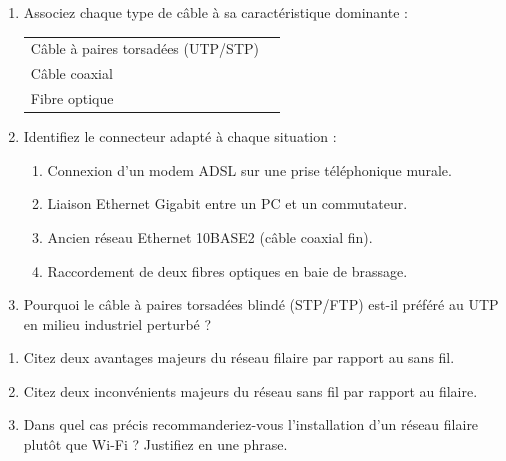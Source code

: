 \documentclass[11pt]{article}
\begin{document}
\begin{exercice}
\begin{enumerate}
    \item Associez chaque type de câble à sa caractéristique dominante :
    \begin{tabular}{ll}
        Câble à paires torsadées (UTP/STP) & \underline{\hspace{5cm}} \\
        Câble coaxial & \underline{\hspace{5cm}} \\
        Fibre optique & \underline{\hspace{5cm}}
    \end{tabular}
    \item Identifiez le connecteur adapté à chaque situation :
    \begin{enumerate}
        \item Connexion d'un modem ADSL sur une prise téléphonique murale.
        \item Liaison Ethernet Gigabit entre un PC et un commutateur.
        \item Ancien réseau Ethernet 10BASE2 (câble coaxial fin).
        \item Raccordement de deux fibres optiques en baie de brassage.
    \end{enumerate}
    \item Pourquoi le câble à paires torsadées blindé (STP/FTP) est-il préféré au UTP en milieu industriel perturbé ?
\end{enumerate}
\end{exercice}

\begin{exercice}
\begin{enumerate}
    \item Citez deux avantages majeurs du réseau filaire par rapport au sans fil.
    \item Citez deux inconvénients majeurs du réseau sans fil par rapport au filaire.
    \item Dans quel cas précis recommanderiez-vous l'installation d'un réseau filaire plutôt que Wi-Fi ? Justifiez en une phrase.
\end{enumerate}
\end{exercice}
\end{document}
